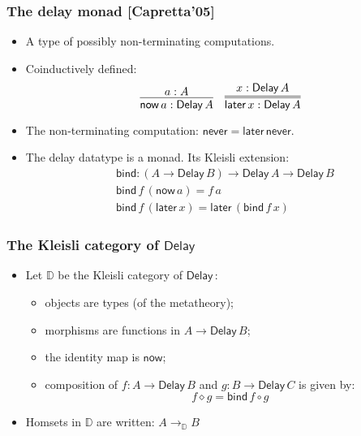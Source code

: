\documentclass[12pt,t]{beamer}
\newcommand{\comp}{\circ}
\newcommand{\Delay}{\ensuremath{\mathsf{Delay}\,}}
\newcommand{\now}{\mathsf{now}}
\newcommand{\later}{\mathsf{later}}
\newcommand{\never}{\mathsf{never}}
\newcommand{\bind}{\mathsf{bind}}
\newcommand{\D}{\mathbb{D}}
\begin{document}
\begin{frame}

  \frametitle{The delay monad [Capretta'05]}
  \begin{itemize}
  \item A type of possibly non-terminating computations.
  \item Coinductively defined:
    \[
    \infer{\now\,a : \Delay A}{a : A}
    \quad
    \infer={\later\,x : \Delay A}{x : \Delay A}
    \]
  \item The non-terminating computation:
    $\never = \later \,\never$.
  \item The delay datatype is a monad. Its Kleisli extension:
    \begin{align*}
      & \bind : (A \to \Delay B) \to \Delay A \to \Delay B \\
      & \bind \,f \, (\now\,a) = f\,a \\
      & \bind\,f\,(\later\,x) = \later\,(\bind\,f\,x)
    \end{align*}

  \end{itemize}
  
  
\end{frame}

\begin{frame}

  \frametitle{The Kleisli category of $\Delay$}
  \begin{itemize}

  \item Let $\D$ be the Kleisli category of $\Delay$:
    \begin{itemize}
    \item objects are types (of the metatheory);
    \item morphisms are functions in $A \to \Delay B$;
    \item the identity map is $\now$;
    \item composition of $f : A \to \Delay B$ and $g : B \to \Delay C$
      is given by:
      \[f \diamond g = \bind\,f \comp g\]
    \end{itemize}
\item Homsets in $\D$ are written: $A \to_\D B$   
  \end{itemize}
  
\end{frame}
\end{document}
